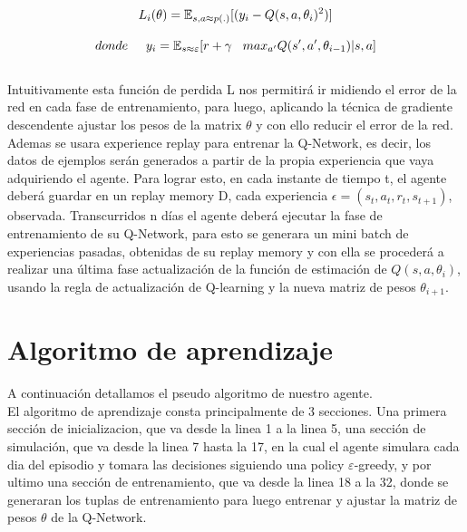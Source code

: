 \begin{equation}
L_i(\theta) = \operatorname{\mathbb{E}}_{s, a \approx p(.)}[(y_i - Q(s, a, \theta_i)^2)]
\\\\ 
\end{equation}

\begin{equation}
donde \hspace*{0.5cm}  y_i =  \operatorname{\mathbb{E}}_{s \approx \varepsilon}[r + \gamma  \hspace*{0.3cm}  max_{a'} Q(s', a', \theta_{i-1}) | s, a]
\end{equation}
\\

Intuitivamente esta función de perdida L nos permitirá ir midiendo el error de la red en cada fase de entrenamiento, para luego, aplicando la técnica de gradiente descendente ajustar los pesos de la matrix $\theta$ y con ello reducir el error de la red.
\\

Ademas se usara experience replay para entrenar la Q-Network, es decir, los datos de ejemplos serán generados a partir de la propia experiencia que vaya adquiriendo el agente. Para lograr esto, en cada instante de tiempo t, el agente deberá guardar en un replay memory D, cada experiencia $\epsilon = (s_t, a_t, r_t, s_{t+1})$, observada.
Transcurridos n días el agente deberá ejecutar la fase de entrenamiento de su Q-Network, para esto se generara un mini batch de experiencias pasadas, obtenidas de  su replay memory y con ella se procederá a realizar una última fase actualización de la función de estimación de $Q(s, a, \theta_i)$, usando la regla de actualización de Q-learning y la nueva matriz de pesos $\theta_{i+1}$.

\section{Algoritmo de aprendizaje}
A continuación detallamos el pseudo algoritmo de nuestro agente.
\\
El algoritmo de aprendizaje consta principalmente de 3 secciones. Una primera sección de inicializacion, que va desde la linea 1 a la linea 5, una sección de simulación, que va desde la linea 7 hasta la 17, en la cual el agente simulara cada dia del episodio y tomara las decisiones siguiendo una policy $\varepsilon$-greedy, y por ultimo una sección de entrenamiento, que va desde la linea 18 a la 32, donde se generaran los tuplas de entrenamiento para luego entrenar y ajustar la matriz de pesos $\theta$ de la Q-Network.


